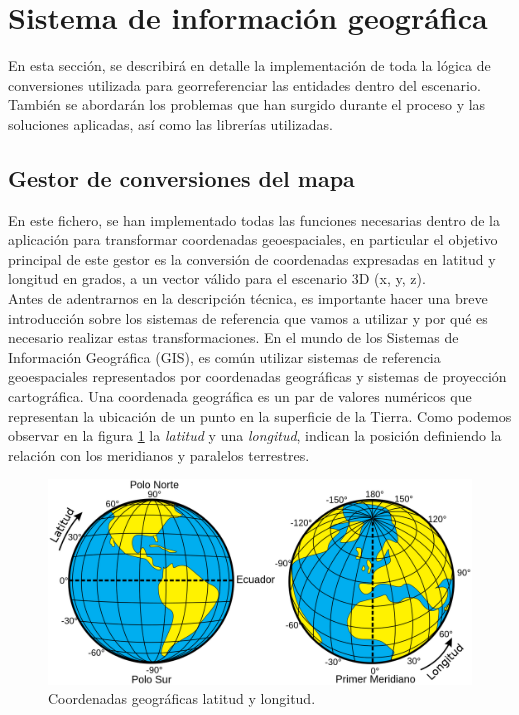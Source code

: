 \documentclass[a4paper, 11pt]{book}
\begin{document}
\clearpage
\section{Sistema de información geográfica}
\label{sec:gis}
En esta sección, se describirá en detalle la implementación de toda la lógica de conversiones utilizada para georreferenciar las entidades dentro del escenario. También se abordarán los problemas que han surgido durante el proceso y las soluciones aplicadas, así como las librerías utilizadas.
\subsection{Gestor de conversiones del mapa}
\label{subsec:mapConversion}
En este fichero, se han implementado todas las funciones necesarias dentro de la aplicación para transformar coordenadas geoespaciales, en particular el objetivo principal de este gestor es la conversión de coordenadas expresadas en latitud y longitud en grados, a un vector válido para el escenario 3D (x, y, z).\\
Antes de adentrarnos en la descripción técnica, es importante hacer una breve introducción sobre los sistemas de referencia que vamos a utilizar y por qué es necesario realizar estas transformaciones.
En el mundo de los Sistemas de Información Geográfica (\textsc{GIS}), es común utilizar sistemas de referencia geoespaciales representados por coordenadas geográficas y sistemas de proyección cartográfica.
Una coordenada geográfica es un par de valores numéricos que representan la ubicación de un punto en la superficie de la Tierra. Como podemos observar en la figura \ref{fig:latlong} la \emph{latitud} y una \emph{longitud}, indican la posición definiendo la relación con los meridianos y paralelos terrestres.

\begin{figure}[h]
	\centering
	\includegraphics[width=12cm, keepaspectratio]{img/Latitud_y_Longitud_en_la_Tierra.svg.png}
	\caption{Coordenadas geográficas latitud y longitud.}
	\label{fig:latlong}
\end{figure}
\end{document}

